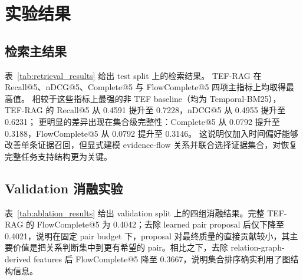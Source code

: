 \section{实验结果}
\label{sec:results}

\subsection{检索主结果}

表~\ref{tab:retrieval_results} 给出 test split 上的检索结果。
TEF-RAG 在 Recall@5、nDCG@5、Complete@5 与 FlowComplete@5 四项主指标上均取得最高值。
相较于这些指标上最强的非 TEF baseline（均为 Temporal-BM25），
TEF-RAG 的 Recall@5 从 0.4591 提升至 0.7228，nDCG@5 从 0.4955 提升至 0.6231；
更明显的差异出现在集合级完整性：Complete@5 从 0.0792 提升至 0.3188，FlowComplete@5 从 0.0792 提升至 0.3146。
这说明仅加入时间偏好能够改善单条证据召回，但显式建模 evidence-flow 关系并联合选择证据集合，对恢复完整任务支持结构更为关键。

\begin{table}[t]
\caption{Retrieval test 的主结果（Top-5）}
\label{tab:retrieval_results}
\centering
\small
\setlength{\tabcolsep}{3pt}
\end{table}

\subsection{Validation 消融实验}
\label{sec:ablation_results}

表~\ref{tab:ablation_results} 给出 validation split 上的四组消融结果。完整 TEF-RAG 的 FlowComplete@5 为 0.4042；去除 learned pair proposal 后仅下降至 0.4021，说明在固定 pair budget 下，proposal 对最终质量的直接贡献较小，其主要价值是把关系判断集中到更有希望的 pair。相比之下，去除 relation-graph-derived features 后 FlowComplete@5 降至 0.3667，说明集合排序确实利用了图结构信息。

